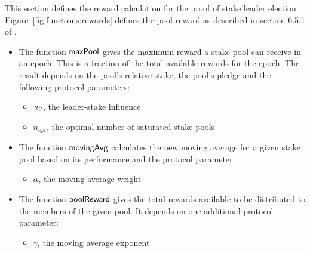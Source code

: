 This section defines the reward calculation for the proof of stake leader election.
Figure~\ref{fig:functions:rewards} defines the pool reward as described in section
6.5.1 of \cite{delegation_design}.

\begin{itemize}
  \item The function $\mathsf{maxPool}$ gives the maximum reward a stake pool can receive in an epoch.
    This is a fraction of the total available rewards for the epoch.
    The result depends on the pool's relative stake, the pool's pledge and the following
    protocol parameters:
    \begin{itemize}
      \item $\mathit{a_0}$, the leader-stake influence
      \item $n_{opt}$, the optimal number of saturated stake pools
    \end{itemize}
  \item The function $\mathsf{movingAvg}$ calculates the new moving average for a given stake pool
    based on its performance and the protocol parameter:
    \begin{itemize}
      \item $\alpha$, the moving average weight
    \end{itemize}
  \item The function $\mathsf{poolReward}$ gives the total rewards available to be distributed
    to the members of the given pool. It depends on one additional protocol parameter:
    \begin{itemize}
      \item $\gamma$, the moving average exponent
    \end{itemize}
\end{itemize}

